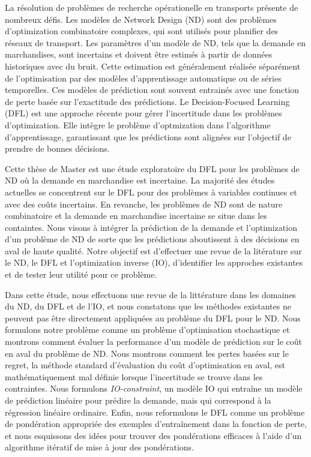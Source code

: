 \begin{frenchabstract}

La résolution de problèmes de recherche opérationelle en transports présente de nombreux défis. Les modèles de \og Network Design \fg (ND) sont des problèmes d'optimization combinatoire complexes, qui sont utilisés pour planifier des réseaux de transport. Les paramètres d'un modèle de ND, tels que la demande en marchandises, sont incertains et doivent être estimés à partir de données historiques avec du bruit. Cette estimation est généralement réalisée séparément de l'optimisation par des modèles d'apprentissage automatique ou de séries temporelles. Ces modèles de prédiction sont souvent entrainés avec une fonction de perte basée sur l'exactitude des prédictions. Le \og Decision-Focused Learning \fg (DFL) est une approche récente pour gérer l'incertitude dans les problèmes d'optimization. Elle intègre le problème d'optmization dans l'algorithme d'apprentissage, garantissant que les prédictions sont alignées sur l'objectif de prendre de bonnes décisions.

Cette thèse de Master est une étude exploratoire du DFL pour les problèmes de ND où la demande en marchandise est incertaine. La majorité des études actuelles se concentrent sur le DFL pour des problèmes à variables continues et avec des coûts incertains. En revanche, les problèmes de ND sont de nature combinatoire et la demande en marchandise incertaine se situe dans les containtes. Nous visons à intégrer la prédiction de la demande et l'optimization d'un problème de ND de sorte que les prédictions aboutissent à des décisions en aval de haute qualité. Notre objectif est d'effectuer une revue de la litérature sur le ND, le DFL et l'optimization inverse (IO), d'identifier les approches existantes et de tester leur utilité pour ce problème.

Dans cette étude, nous effectuons une revue de la littérature dans les domaines du ND, du DFL et de l'IO, et nous constatons que les méthodes existantes ne peuvent pas être directement appliquées au problème du DFL pour le ND. Nous formulons notre problème comme un problème d'optimisation stochastique et montrons comment évaluer la performance d'un modèle de prédiction sur le coût en aval du problème de ND. Nous montrons comment les pertes basées sur le regret, la méthode standard d'évaluation du coût d'optimisation en aval, est mathématiquement mal définie lorsque l'incertitude se trouve dans les contraintes. Nous formulons \textit{IO-constraint}, un modèle IO qui entraîne un modèle de prédiction linéaire pour prédire la demande, mais qui correspond à la régression linéaire ordinaire. Enfin, nous reformulons le DFL comme un problème de pondération appropriée des exemples d'entraînement dans la fonction de perte, et nous esquissons des idées pour trouver des pondérations efficaces à l'aide d'un algorithme itératif de mise à jour des pondérations.

\end{frenchabstract}